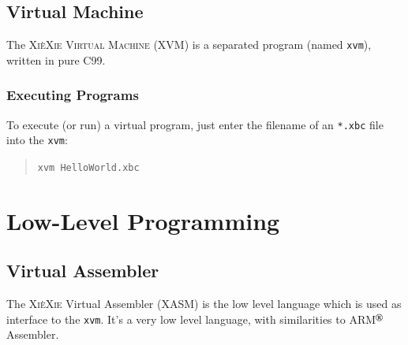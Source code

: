 \documentclass{report}
\def\xiexie{\textsc{Xi\`eXie}\xspace}
\def\xvm{\texttt{xvm}\xspace}
\begin{document}

\chapter{Virtual Machine}

The \textsc{\xiexie Virtual Machine} (XVM) is a separated program (named \xvm), written in pure C99.



\section{Executing Programs}

To execute (or run) a virtual program, just enter the filename of an \texttt{*.xbc} file into the \xvm:
\begin{quote}
\texttt{xvm HelloWorld.xbc}
\end{quote}



\part{Low-Level Programming}



\chapter{Virtual Assembler}

The \xiexie Virtual Assembler (XASM) is the low level language which is used as interface to the \xvm.
It's a very low level language, with similarities to ARM$^\text{\scriptsize\textregistered}$ Assembler.


\end{document}
